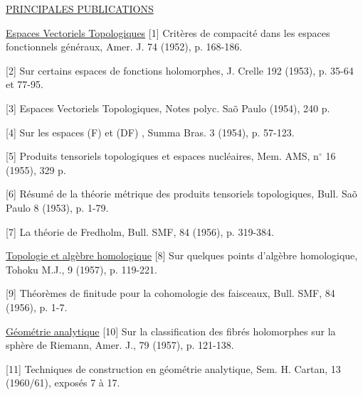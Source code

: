 
\uline{PRINCIPALES PUBLICATIONS}

\uline{Espaces Vectoriels Topologiques}
[1] Critères de compacité dans les espaces fonctionnels
généraux, Amer. J. 74 (1952), p. 168-186.

[2] Sur certains espaces de fonctions holomorphes,
J. Crelle 192 (1953), p. 35-64 et 77-95.

[3] Espaces Vectoriels Topologiques, Notes polyc.
Sa\~{o} Paulo (1954), 240 p.

[4] Sur les espaces (F) et (DF) , Summa Bras. 3
(1954), p. 57-123.

[5] Produits tensoriels topologiques et espaces
nucléaires, Mem. AMS, n$^\circ$ 16 (1955), 329 p.

[6] Résumé de la théorie métrique des produits
tensoriels topologiques, Bull. Sa\~{o} Paulo 8 (1953),
p. 1-79.

[7] La théorie de Fredholm, Bull. SMF, 84 (1956),
p. 319-384.

\uline{Topologie et algèbre homologique}
[8] Sur quelques points d'algèbre homologique,
Tohoku M.J., 9 (1957), p. 119-221.

[9] Théorèmes de finitude pour la cohomologie des
faisceaux, Bull. SMF, 84 (1956), p. 1-7.

\uline{Géométrie analytique}
[10] Sur la classification des fibrés holomorphes
sur la sphère de Riemann, Amer. J., 79 (1957),
p. 121-138.

[11] Techniques de construction en géométrie analytique,
Sem. H. Cartan, 13 (1960/61), exposés 7 à 17.

